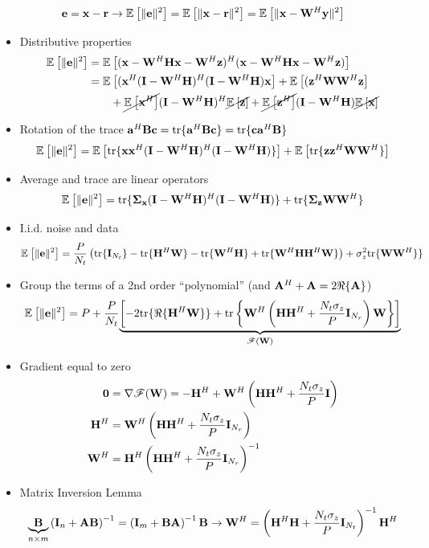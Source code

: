 \documentclass[xcolor=dvipsnames,aspectratio=169]{beamer}
\begin{document}
{    \vspace{-.1in}
    \begin{definition}
     $$\e=\x-\rr\to\Ex{}{\|\e\|^2}=\Ex{}{\|\x-\rr\|^2}=\Ex{}{\|\x-\W^H\y\|^2}$$
    \end{definition}
    \begin{itemize}
     \item Distributive properties
     \begin{equation*}
        \begin{split}
        \Ex{}{\|\e\|^2}&=\Ex{}{(\x-\W^H\Hb\x-\W^H\z)^H(\x-\W^H\Hb\x-\W^H\z)}\\
                        &=\Ex{}{(\x^H(\I-\W^H\Hb)^H(\I-\W^H\Hb)\x}+\Ex{}{(\z^H\W\W^H\z}\\
                        &\qquad+\cancel{\Ex{}{\x^H}}(\I-\W^H\Hb)^H\cancel{\Ex{}{\z}}+\cancel{\Ex{}{\z^H}}(\I-\W^H\Hb)\cancel{\Ex{}{\x}}\\
        \end{split}
     \end{equation*}
     \item Rotation of the trace $\ab^H\B\cc=\tr\{\ab^H\B\cc\}=\tr\{\cc\ab^H\B\}$
     $$\Ex{}{\|\e\|^2}=\Ex{}{\tr\{\x\x^H(\I-\W^H\Hb)^H(\I-\W^H\Hb)\}}+\Ex{}{\tr\{\z\z^H\W\W^H\}}$$
     \item Average and trace are linear operators
     $$\Ex{}{\|\e\|^2}=\tr\{\Sg_{\x}(\I-\W^H\Hb)^H(\I-\W^H\Hb)\}+\tr\{\Sg_{\z}\W\W^H\}$$
     \item I.i.d. noise and data 
     $$\Ex{}{\|\e\|^2}=\frac{P}{N_t}\left(\tr\{\I_{N_t}\}-\tr\{\Hb^H\W\}-\tr\{\W^H\Hb\}+\tr\{\W^H\Hb\Hb^H\W\}\right)+\sigma_z^2\tr\{\W\W^H\}\}$$
     \item Group the terms of a 2nd order ``polynomial'' (and $\A^H+\A=2\Re\{\A\}$)
     $$\Ex{}{\|\e\|^2}=P+\frac{P}{N_t}\underset{\mathscr{F}(\W)}{\underbrace{\left[-2\tr\{\Re\{\Hb^H\W\}\}+\tr\left\{\W^H\left(\Hb\Hb^H+\frac{N_t\sigma_z}{P}\I_{N_{r}}\right)\W\right\}\right]}}$$
     \item Gradient equal to zero
       \begin{equation*}
        \begin{split}
        \zero &= \nabla \mathscr{F}(\W) =-\Hb^H+\W^H\left(\Hb\Hb^H+\frac{N_t\sigma_z}{P}\I\right)\\
                        \Hb^H&=\W^H\left(\Hb\Hb^H+\frac{N_t\sigma_z}{P}\I_{N_{r}}\right)\\
                        \W^H&=\Hb^H\left(\Hb\Hb^H+\frac{N_t\sigma_z}{P}\I_{N_{r}}\right)^{-1}\\
        \end{split}
        \end{equation*}
     \item Matrix Inversion Lemma
     $$\underset{n\times m}{\underbrace{\B}}\left(\I_{n}+\A\B\right)^{-1}=\left(\I_{m}+\B\A\right)^{-1}\B\to \W^H=\left(\Hb^H\Hb+\frac{N_t\sigma_z}{P}\I_{N_t}\right)^{-1}\Hb^H$$
    \end{itemize}
    
}
\end{document}
